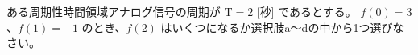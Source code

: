 ある周期性時間領域アナログ信号の周期が $\textrm{T} = 2$ [秒] であるとする。
$f(0) = 3$、$f(1) = -1$ のとき、$f(2)$ はいくつになるか選択肢a〜dの中から1つ選びなさい。
